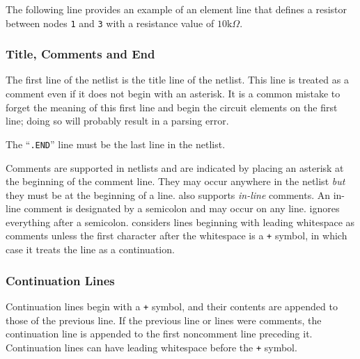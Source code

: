 The following line provides an example of an element line that defines a
resistor between nodes \texttt{1} and \texttt{3} with a resistance value 
of $10 \mbox{k}\Omega$.


\subsubsection{Title, Comments and End}

The first line of the netlist is the title line of the netlist.  This line is treated as a comment even if it
does not begin with an asterisk.  It is a common mistake to forget the
meaning of this first line and begin the circuit elements on the first
line; doing so will probably result in a parsing error.


The ``\verb+.END+'' line must be the last line in the
netlist.

Comments are supported in netlists and are indicated by
placing an asterisk at the beginning of the comment line.  They may occur
anywhere in the netlist \emph{but} they must be at the beginning of a line.
\Xyce{} also supports \emph{in-line\/} comments.  An in-line comment is designated by a semicolon and may occur on any line. \Xyce{} ignores everything after a semicolon. \Xyce{} considers lines beginning with leading whitespace as comments
unless the first character after the whitespace is a \verb|+| symbol, in which case it treats the line as a continuation. 




\subsubsection{Continuation Lines}
Continuation lines begin with a \verb|+| symbol, and their contents are appended to those of the previous line.  If the previous line or lines were comments, the continuation line is
appended to the first noncomment line preceding it.  Continuation lines can have leading whitespace before the \verb|+| symbol.

